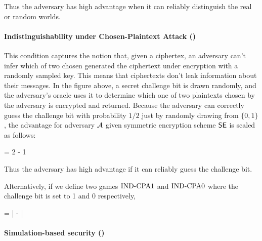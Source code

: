 Thus the adversary has high advantage when it can reliably distinguish the real
or random worlds.

\paragraph{Indistinguishability under Chosen-Plaintext Attack (\INDCPA)}



This condition captures the notion that, given a ciphertex, an adversary can't
infer which of two chosen generated the ciphertext under encryption with a
randomly sampled key. This means that ciphertexts don't leak information about
their messages. In the figure above, a secret challenge bit is drawn randomly,
and the adversary's oracle uses it to determine which one of two plaintexts
chosen by the adversary is encrypted and returned.  Because the adversary can
correctly guess the challenge bit with probability $1/2$ just by randomly
drawing from $\{0,1\}$, the advantage for adversary ${\mathcal A}$ given symmetric
encryption scheme $\textnormal{\textsf{SE}}$  is scaled as follows:

\bnm
\AdvINDCPA{\SE}{\advA} = 2\cdotsm\Prob{\INDCPA_\SE^\advA\Rightarrow\true} - 1
\enm

Thus the adversary has high advantage if it can reliably guess the challenge
bit.

Alternatively, if we define two games $\textnormal{IND-CPA}1$ and $\textnormal{IND-CPA}0$ where the
challenge bit is set to 1 and 0 respectively, 

\bnm
\AdvINDCPA{\SE}{\advA} = 
    \left| -  \right| 
\enm

\paragraph{Simulation-based security (\INDSIM)}

